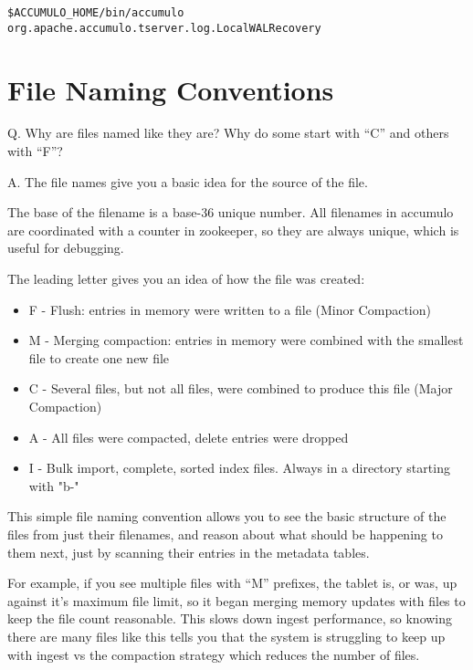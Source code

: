 \small
\begin{verbatim}
$ACCUMULO_HOME/bin/accumulo org.apache.accumulo.tserver.log.LocalWALRecovery
\end{verbatim}
\normalsize

\section{File Naming Conventions}

Q. Why are files named like they are? Why do some start with ``C'' and others with ``F''?

A. The file names give you a basic idea for the source of the file.

The base of the filename is a base-36 unique number. All filenames in accumulo are coordinated 
with a counter in zookeeper, so they are always unique, which is useful for debugging.

The leading letter gives you an idea of how the file was created:

\begin{itemize}
 \item F - Flush: entries in memory were written to a file (Minor Compaction)
 \item M - Merging compaction: entries in memory were combined with the smallest file to create one new file
 \item C - Several files, but not all files, were combined to produce this file (Major Compaction)
 \item A - All files were compacted, delete entries were dropped
 \item I - Bulk import, complete, sorted index files. Always in a directory starting with "b-"
\end{itemize}

This simple file naming convention allows you to see the basic structure of the files from just 
their filenames, and reason about what should be happening to them next, just
by scanning their entries in the metadata tables.

For example, if you see multiple files with ``M'' prefixes, the tablet is, or was, up against it's
maximum file limit, so it began merging memory updates with files to keep the file count reasonable.  This
slows down ingest performance, so knowing there are many files like this tells you that the system
is struggling to keep up with ingest vs the compaction strategy which reduces the number of files.

